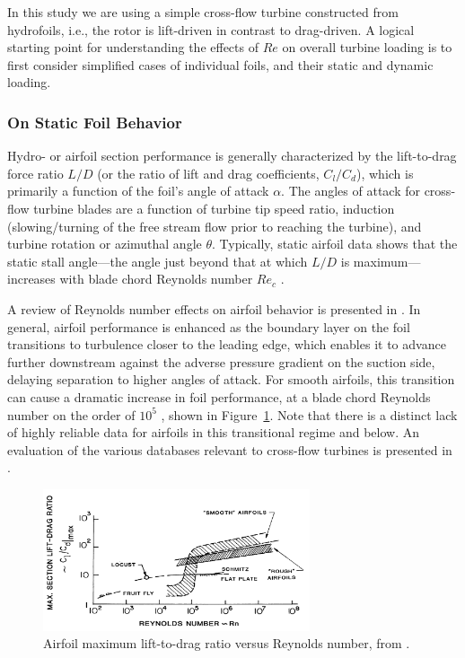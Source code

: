 \documentclass[energies,article,accept,moreauthors,pdftex,12pt,a4paper]{mdpi}
\begin{document}
In this study we are using a simple cross-flow turbine constructed from
hydrofoils, i.e., the rotor is lift-driven in contrast to drag-driven. A logical
starting point for understanding the effects of $Re$ on overall turbine loading
is to first consider simplified cases of individual foils, and their static and
dynamic loading.


\subsubsection{On Static Foil Behavior}

Hydro- or airfoil section performance is generally characterized by the
lift-to-drag force ratio $L/D$ (or the ratio of lift and drag coefficients,
$C_l/C_d$), which is primarily a function of the foil's angle of attack
$\alpha$. The angles of attack for cross-flow turbine blades are a function of
turbine tip speed ratio, induction (slowing/turning of the free stream flow
prior to reaching the turbine), and turbine rotation or azimuthal angle
$\theta$. Typically, static airfoil data shows that the static stall
angle---the angle just beyond that at which $L/D$ is maximum---increases with
blade chord Reynolds number $Re_c$ \cite{Jacobs1937}.

A review of Reynolds number effects on airfoil behavior is presented in
\cite{Lissaman1983}. In general, airfoil performance is enhanced as the boundary
layer on the foil transitions to turbulence closer to the leading edge, which
enables it to advance further downstream against the adverse pressure gradient
on the suction side, delaying separation to higher angles of attack. For smooth
airfoils, this transition can cause a dramatic increase in foil performance, at
a blade chord Reynolds number on the order of $10^5$ \cite{McMasters1980}, shown
in Figure~\ref{fig:McMasters}. Note that there is a distinct lack of highly
reliable data for airfoils in this transitional regime and below. An evaluation
of the various databases relevant to cross-flow turbines is presented in
\cite{Bedon2014}.


\begin{figure}[ht]
\centering

\includegraphics[width=0.7\textwidth]{figures/McMasters-Henderson-1980}

\caption{Airfoil maximum lift-to-drag ratio versus Reynolds number, from
    \cite{McMasters1980}.}

\label{fig:McMasters}
\end{figure}
\end{document}
